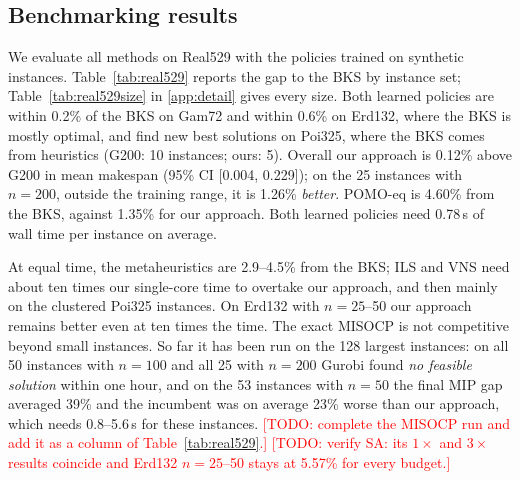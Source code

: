 \documentclass[preprint,review,12pt,authoryear]{elsarticle}
\newcommand{\todo}[1]{\textcolor{red}{[TODO: #1]}}
\begin{document}
\subsection{Benchmarking results}\label{sec:real529}
We evaluate all methods on Real529 with the policies trained on synthetic instances. Table~\ref{tab:real529}
reports the gap to the BKS by instance set; Table~\ref{tab:real529size} in \ref{app:detail} gives every size. Both
learned policies are within 0.2\% of the BKS on Gam72 and within 0.6\% on Erd132, where the BKS is mostly optimal,
and find new best solutions on Poi325, where the BKS comes from heuristics (G200: 10 instances; ours: 5). Overall
our approach is 0.12\% above G200 in mean makespan (95\% CI [0.004, 0.229]); on the 25 instances with $n=200$,
outside the training range, it is 1.26\% \emph{better}. POMO-eq is 4.60\% from the BKS, against 1.35\% for our
approach. Both learned policies need 0.78\,s of wall time per instance on average.

At equal time, the metaheuristics are 2.9--4.5\% from the BKS; ILS and VNS need about ten times our single-core
time to overtake our approach, and then mainly on the clustered Poi325 instances. On Erd132 with $n=25$--50 our
approach remains better even at ten times the time. The exact MISOCP is not competitive beyond small instances.
So far it has been run on the 128 largest instances: on all 50 instances with $n=100$ and all 25 with $n=200$ Gurobi
found \emph{no feasible solution} within one hour, and on the 53 instances with $n=50$ the final MIP gap averaged
39\% and the incumbent was on average 23\% worse than our approach, which needs 0.8--5.6\,s for these instances.
\todo{complete the MISOCP run and add it as a column of Table~\ref{tab:real529}.}
\todo{verify SA: its $1\times$ and $3\times$ results coincide and Erd132 $n=25$--50 stays at 5.57\% for every
budget.}
\end{document}
